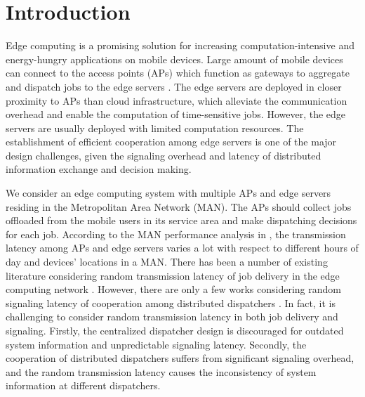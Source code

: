 \section{Introduction}
\label{sec:introduction}
Edge computing is a promising solution for increasing computation-intensive and energy-hungry applications on mobile devices.
Large amount of mobile devices can connect to the access points (APs) which function as gateways to aggregate and dispatch jobs to the edge servers \cite{MEC-SURVEY}.
The edge servers are deployed in closer proximity to APs than cloud infrastructure, which alleviate the communication overhead and enable the computation of time-sensitive jobs.
However, the edge servers are usually deployed with limited computation resources.
The establishment of efficient cooperation among edge servers is one of the major design challenges, given the signaling overhead and latency of distributed information exchange and decision making.

We consider an edge computing system with multiple APs and edge servers residing in the Metropolitan Area Network (MAN).
The APs should collect jobs offloaded from the mobile users in its service area and make dispatching decisions for each job.
According to the MAN performance analysis in \cite{MAN-LATENCY}, the transmission latency {among APs and edge servers} varies a lot with respect to different hours of day and devices' locations in a MAN.
There has been a number of existing literature considering random transmission latency of job delivery in the edge computing network \cite{latency-EDGE19,MOBIHOC19-ZhouZ,IOTJ18-FanQ,TOC19-LiuC,JSAC19-AlameddineHA}.
However, there are only a few works considering random signaling latency of cooperation among distributed dispatchers \cite{tan-online,TWC18-LyuX}.
In fact, it is challenging to consider random transmission latency in both job delivery and signaling.
Firstly, the centralized dispatcher design is discouraged for outdated system information and unpredictable signaling latency.
Secondly, the cooperation of distributed dispatchers suffers from significant signaling overhead, and the random transmission latency causes the inconsistency of system information at different dispatchers.

